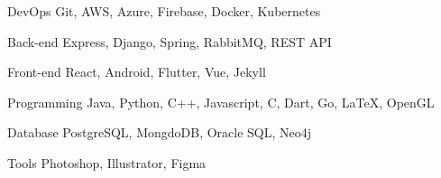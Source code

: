 

\begin{cvskills}

  \cvskill
    {DevOps} %
    {Git, AWS, Azure, Firebase, Docker, Kubernetes} %

  \cvskill
    {Back-end} %
    {Express, Django, Spring, RabbitMQ, REST API} %

  \cvskill
    {Front-end} %
    {React, Android, Flutter, Vue, Jekyll} %

  \cvskill
    {Programming} %
    {Java, Python, C++, Javascript, C, Dart, Go, LaTeX, OpenGL} %

  \cvskill
    {Database} %
    {PostgreSQL, MongdoDB, Oracle SQL, Neo4j} %

  \cvskill
    {Tools} %
    {Photoshop, Illustrator, Figma} %
    
\end{cvskills}
